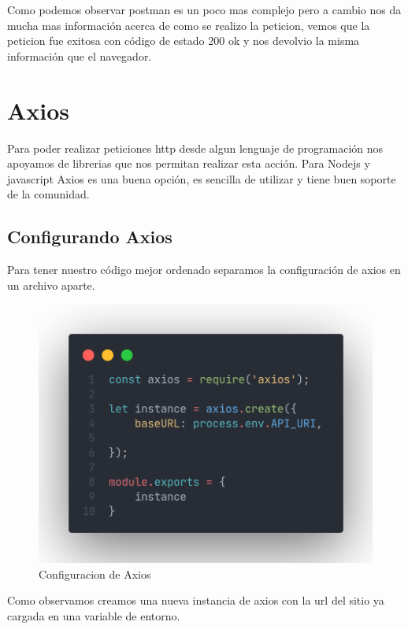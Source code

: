 \documentclass[12pt]{article}
\begin{document}
Como podemos observar postman es un poco mas complejo pero a cambio nos da mucha mas información acerca de como se realizo la peticion, vemos que la peticion fue exitosa con código de estado 200 ok y nos devolvio la misma información que el navegador.

\newpage

\section{Axios}

Para poder realizar peticiones http desde algun lenguaje de programación nos apoyamos de librerias que nos permitan realizar esta acción. Para Nodejs y javascript Axios es una buena opción, es sencilla de utilizar y tiene buen soporte de la comunidad.

\subsection{Configurando Axios}

Para tener nuestro código mejor ordenado separamos la configuración de axios en un archivo aparte.

\begin{figure}[H]
    \centering
    \includegraphics[scale=.4]{assets/images/axios-config.png}
    \caption{Configuracion de Axios}
\end{figure}

Como observamos creamos una nueva instancia de axios con la url del sitio ya cargada en una variable de entorno.
\end{document}
